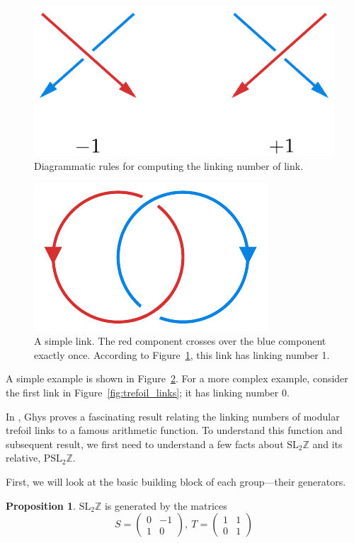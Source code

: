 \documentclass[12pt,twoside]{reedthesis}
\theoremstyle{definition}
\newtheorem{prop}[thm]{Proposition}
\newcommand{\Z}{\mathbb{Z}}
\newcommand{\SLZ}{\mathrm{SL}_2{\Z}}
\newcommand{\PSLZ}{\mathrm{PSL}_2{\Z}}
\begin{document}
\begin{figure}[t]
  \centering
  \includegraphics[width=0.3\linewidth]{figures/linking_number.pdf}
  \caption{Diagrammatic rules for computing the linking number of link.}
  \label{fig:linking_number}
\end{figure}

\begin{figure}[b]
  \centering
  \includegraphics[width=0.3\linewidth]{figures/linking_number_example.pdf}
  \caption{A simple link. The red component crosses over the blue component exactly once. According to Figure~\ref{fig:linking_number}, this link has linking number 1.}
  \label{fig:linking_number_example}
\end{figure}

A simple example is shown in Figure~\ref{fig:linking_number_example}.
For a more complex example, consider the first link in Figure~\ref{fig:trefoil_links}; it has linking number 0.

In \cite{ghys2007}, Ghys proves a fascinating result relating the linking numbers of modular trefoil links to a famous arithmetic function.
To understand this function and subsequent result, we first need to understand a few facts about $\SLZ$ and its relative, $\PSLZ$.

First, we will look at the basic building block of each group---their generators.

\begin{prop}
  $\SLZ$ is generated by the matrices
  \begin{equation*}
    S = \begin{pmatrix}
      0 & -1 \\
      1 & 0
    \end{pmatrix},\
    T = \begin{pmatrix}
      1 & 1 \\
      0 & 1
    \end{pmatrix}
  \end{equation*}
\end{prop}
\end{document}

